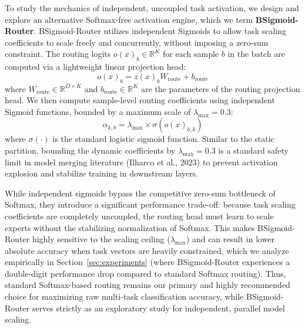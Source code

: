 To study the mechanics of independent, uncoupled task activation, we design and explore an alternative Softmax-free activation engine, which we term \textbf{BSigmoid-Router}. BSigmoid-Router utilizes independent Sigmoids to allow task scaling coefficients to scale freely and concurrently, without imposing a zero-sum constraint. The routing logits $o(x)_b \in \mathbb{R}^K$ for each sample $b$ in the batch are computed via a lightweight linear projection head:
\begin{equation}
    o(x)_b = z(x)_b W_{\text{route}} + b_{\text{route}}
\end{equation}
where $W_{\text{route}} \in \mathbb{R}^{D \times K}$ and $b_{\text{route}} \in \mathbb{R}^K$ are the parameters of the routing projection head. 
We then compute sample-level routing coefficients using independent Sigmoid functions, bounded by a maximum scale of $\lambda_{\text{max}} = 0.3$:
\begin{equation}
    \alpha_{k, b} = \lambda_{\text{max}} \times \sigma(o(x)_{b, k})
\end{equation}
where $\sigma(\cdot)$ is the standard logistic sigmoid function. Similar to the static partition, bounding the dynamic coefficients by $\lambda_{\text{max}} = 0.3$ is a standard safety limit in model merging literature (Ilharco et al., 2023) to prevent activation explosion and stabilize training in downstream layers. 

While independent sigmoids bypass the competitive zero-sum bottleneck of Softmax, they introduce a significant performance trade-off: because task scaling coefficients are completely uncoupled, the routing head must learn to scale experts without the stabilizing normalization of Softmax. This makes BSigmoid-Router highly sensitive to the scaling ceiling ($\lambda_{\text{max}}$) and can result in lower absolute accuracy when task vectors are heavily constrained, which we analyze empirically in Section~\ref{sec:experiments} (where BSigmoid-Router experiences a double-digit performance drop compared to standard Softmax routing). Thus, standard Softmax-based routing remains our primary and highly recommended choice for maximizing raw multi-task classification accuracy, while BSigmoid-Router serves strictly as an exploratory study for independent, parallel model scaling.

